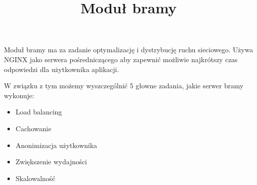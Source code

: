 \documentclass[12pt]{article}
\title{Moduł bramy}
\begin{document}
\maketitle

Moduł bramy ma za zadanie optymalizację i dystrybucję ruchu sieciowego.
Używa NGINX jako serwera pośredniczącego aby zapewnić możliwie najkrótszy czas
odpowiedzi dla użytkownika aplikacji.

W związku z tym możemy wyszczególnić 5 głowne zadania, jakie serwer bramy wykonuje:


\begin{itemize}
  \item Load balancing
  \item Cachowanie
  \item Anonimizacja użytkownika
  \item Zwiększenie wydajności
  \item Skalowalność
\end{itemize}
\end{document}
